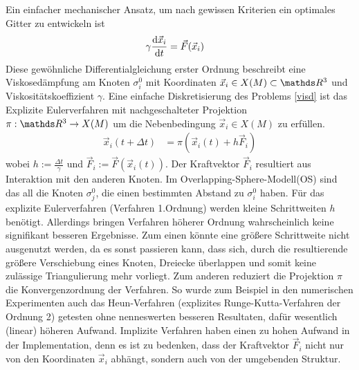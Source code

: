     Ein einfacher mechanischer Ansatz, um nach gewissen Kriterien ein optimales Gitter zu entwickeln ist
    \begin{align}
      \gamma\frac{\mathrm{d} \vec{x}_{i}}{\mathrm{d} t} &= \vec{F}(\vec{x}_{i})
      \label{visd}
    \end{align}
    Diese gewöhnliche Differentialgleichung erster Ordnung beschreibt eine Viskosedämpfung am Knoten 
    \( \sigma^{0}_{i} \) mit Koordinaten \( \vec{x}_{i} \in X(M) \subset \R^{3}\) und Viskositätskoeffizient \( \gamma \).
    Eine einfache Diskretisierung des Problems \eqref{visd} ist das Explizite Eulerverfahren 
    mit nachgeschalteter Projektion \( \pi:\R^{3} \rightarrow X(M) \) um die Nebenbedingung \( \vec{x}_{i} \in X(M) \)
    zu erfüllen.
    \begin{align}
      \vec{x}_{i}(t+\Delta t) &= \pi\left(\vec{x}_{i}(t) + h \vec{F}_{i}\right)
      \label{euler}
    \end{align}
    wobei \( h:= \frac{\Delta t}{\gamma} \) und \( \vec{F}_{i}:= \vec{F}(\vec{x}_{i}(t)) \).
    Der Kraftvektor \( \vec{F}_{i} \) resultiert aus Interaktion mit den anderen Knoten. 
    Im Overlapping-Sphere-Modell(OS)\cite{meshCooper} sind das all die Knoten \( \sigma^{0}_{j} \), die einen bestimmten Abstand zu \( \sigma^{0}_{i} \) haben.
    Für das explizite Eulerverfahren (Verfahren 1.Ordnung) werden kleine Schrittweiten \( h \) benötigt. 
    Allerdings bringen Verfahren höherer Ordnung wahrscheinlich keine signifikant besseren Ergebnisse. Zum einen könnte eine größere Schrittweite
    nicht ausgenutzt werden, da es sonst passieren kann, dass sich, durch die resultierende größere Verschiebung eines Knoten, Dreiecke überlappen
    und somit keine zulässige Triangulierung mehr vorliegt. Zum anderen reduziert die Projektion \( \pi \) die Konvergenzordnung der Verfahren.
    So wurde zum Beispiel in den numerischen Experimenten auch das Heun-Verfahren (explizites Runge-Kutta-Verfahren der Ordnung 2) getesten ohne
    nenneswerten besseren Resultaten, dafür wesentlich (linear) höheren Aufwand.
    Implizite Verfahren haben einen zu hohen Aufwand in der Implementation, denn es ist zu bedenken, dass der Kraftvektor \(\vec{F}_{i}\) nicht
    nur von den Koordinaten \(  \vec{x}_{i} \) abhängt, sondern auch von der umgebenden Struktur.

